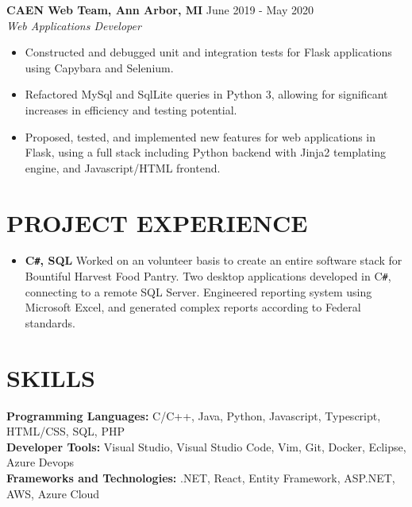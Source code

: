 \documentclass[overlapped]{res}
\begin{document}
\begin{resume}
    \textbf{CAEN Web Team, Ann Arbor, MI}
    \hfill June 2019 - May 2020 \\
    {\sl Web Applications Developer}
    \begin{itemize}  \itemsep -2pt %
        \item Constructed and debugged unit and integration tests for Flask applications using Capybara and Selenium.
        \item Refactored MySql and SqlLite queries in Python 3, allowing for significant increases in efficiency and testing potential.
        \item Proposed, tested, and implemented new features for web applications in Flask, using a full stack including Python backend with Jinja2 templating engine, and Javascript/HTML frontend.
              
    \end{itemize}
    
    \section{PROJECT EXPERIENCE}
    
    \begin{itemize}[label={}]  \itemsep -2pt %
        \item \textbf{C\texttt{\#}, SQL}
              Worked on an volunteer basis to create an entire software stack for Bountiful Harvest Food Pantry. Two desktop applications developed in C\texttt{\#},
              connecting to a remote SQL Server. Engineered reporting system using Microsoft Excel, and generated complex reports according
              to Federal standards.
    \end{itemize}
    
    \section{SKILLS}
    \vspace{1mm}
    \small{
        \textbf{Programming Languages:} C/C++, Java, Python, Javascript, Typescript, HTML/CSS, SQL, PHP \\
        \textbf{Developer Tools:} Visual Studio, Visual Studio Code, Vim, Git, Docker, Eclipse, Azure Devops \\
        \textbf{Frameworks and Technologies:} .NET, React, Entity Framework, ASP.NET, AWS, Azure Cloud
    }
    
\end{resume}
\end{document}
